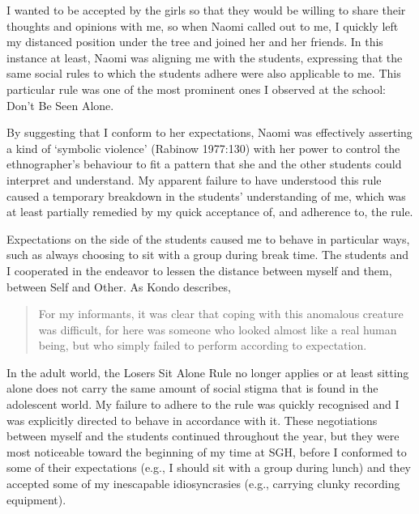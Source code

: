 I wanted to be accepted by the girls so that they would be willing to share their thoughts and opinions with me, so when Naomi called out to me, I quickly left my distanced position under the tree and joined her and her friends. In this instance at least, Naomi was aligning me with the students, expressing that the same social rules to which the students adhere were also applicable to me.  This particular rule was one of the most prominent ones I observed at the school: Don't Be Seen Alone.  

By suggesting that I conform to her expectations, Naomi was effectively asserting a kind of `symbolic violence' (Rabinow 1977:130) with her power to control the ethnographer's behaviour to fit a pattern that she and the other students could interpret and understand.  My apparent failure to have understood this rule caused a temporary breakdown in the students' understanding of me, which was at least partially remedied by my quick acceptance of, and adherence to, the rule.
\nocite{rabinow1977} 

Expectations on the side of the students caused me to behave in particular ways, such as always choosing to sit with a group during break time.  The students and I cooperated in the endeavor to lessen the distance between myself and them, between Self and Other.  As Kondo describes,

\begin{quote}
	For my informants, it was clear that coping with this anomalous creature was difficult, for here was someone who looked almost like a real human being, but who simply failed to perform according to expectation. \cite[76]{kondo1986}
\end{quote}

In the adult world, the Losers Sit Alone Rule no longer applies or at least sitting alone does not carry the same amount of social stigma that is found in the adolescent world.  My failure to adhere to the rule was quickly recognised and I was explicitly directed to behave in accordance with it.  These negotiations between myself and the students continued throughout the year, but they were most noticeable toward the beginning of my time at SGH, before I conformed to some of their expectations (e.g., I should sit with a group during lunch) and they accepted some of my inescapable idiosyncrasies (e.g., carrying clunky recording equipment).
\nocite{kondo1986}


